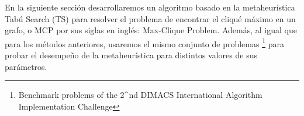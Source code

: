 En la siguiente sección desarrollaremos un algoritmo basado en la metaheurística Tabú Search (TS) para resolver el problema de encontrar el cliqué máximo en un grafo, o MCP por sus
siglas en inglés: Max-Clique Problem. Además, al igual que para los métodos anteriores, usaremos el mismo conjunto de problemas \footnote{Benchmark problems of the 2^{nd} DIMACS International 
Algorithm Implementation Challenge} para probar el desempeño de la metaheurística para distintos valores de sus parámetros.